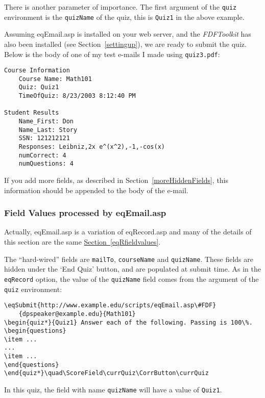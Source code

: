 \documentclass{article}
\let\env\texttt
\begin{document}
\medskip
There is another parameter of importance. The first argument of
the \env{quiz} environment is the \texttt{quizName} of the quiz, this is
\texttt{Quiz1} in the above example.

Assuming \textsf{eqEmail.asp} is installed on your web server, and
the \textsl{FDFToolkit} has also been installed (see
Section~\ref{settingup}), we are ready to submit the quiz. Below
is the body of one of my test e-mails I made using
\texttt{quiz3.pdf}:

\begin{Verbatim}[xleftmargin=\leftmargini,fontsize=\small]
Course Information
    Course Name: Math101
    Quiz: Quiz1
    TimeOfQuiz: 8/23/2003 8:12:40 PM

Student Results
    Name_First: Don
    Name_Last: Story
    SSN: 121212121
    Responses: Leibniz,2x e^(x^2),-1,-cos(x)
    numCorrect: 4
    numQuestions: 4
\end{Verbatim}
\noindent If you add more fields, as described in
Section~\ref{moreHiddenFields}, this information should be appended to
the body of the e-mail.

\subsubsection{Field Values processed by \textsf{eqEmail.asp}}

Actually, \textsf{eqEmail.asp} is a variation of
\textsf{eqRecord.asp} and many of the details of this section are
the same \hyperref[eqRfieldvalues]{Section~\ref*{eqRfieldvalues}}.

The ``hard-wired'' fields are \texttt{mailTo}, \texttt{courseName}
and \texttt{quizName}. These fields are hidden under the `End
Quiz' button, and are populated at submit time.  As in the \texttt{eqRecord}
option, the value of the \texttt{quizName} field comes from the argument of
the \env{quiz} environment:
\begin{Verbatim}[xleftmargin=\leftmargini,fontsize=\small]
\eqSubmit{http://www.example.edu/scripts/eqEmail.asp\#FDF}
    {dpspeaker@example.edu}{Math101}
\begin{quiz*}{Quiz1} Answer each of the following. Passing is 100\%.
\begin{questions}
\item ...
...
\item ...
\end{questions}
\end{quiz*}\quad\ScoreField\currQuiz\CorrButton\currQuiz
\end{Verbatim}
In this quiz, the field with name \texttt{quizName} will have a value of \texttt{Quiz1}.
\end{document}
